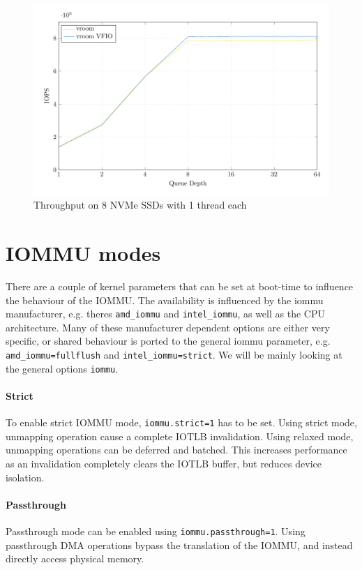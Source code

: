 \begin{figure}[H]
  \centering
  \includegraphics[width=\textwidth]{figures/qdnt1_2MiB_8nvmes}
  \caption{Throughput on 8 NVMe SSDs with 1 thread each}
  \label{fig:8nvmes}
\end{figure}

\section{IOMMU modes}
There are a couple of kernel parameters that can be set at boot-time to influence the behaviour of the IOMMU. The availability is influenced by the iommu manufacturer, e.g. theres \texttt{amd\_iommu} and \texttt{intel\_iommu}, as well as the CPU architecture. Many of these manufacturer dependent options are either very specific, or shared behaviour is ported to the general iommu parameter, e.g. \texttt{amd\_iommu=fullflush} and \texttt{intel\_iommu=strict}. We will be mainly looking at the general options \texttt{iommu}.

\paragraph{Strict}
To enable strict IOMMU mode, \texttt{iommu.strict=1} has to be set. Using strict mode, unmapping operation cause a complete IOTLB invalidation. Using relaxed mode, unmapping operations can be deferred and batched. This increases performance as an invalidation completely clears the IOTLB buffer, but reduces device isolation.

\paragraph{Passthrough}
Passthrough mode can be enabled using \texttt{iommu.passthrough=1}. Using passthrough DMA operations bypass the translation of the IOMMU, and instead directly access physical memory.